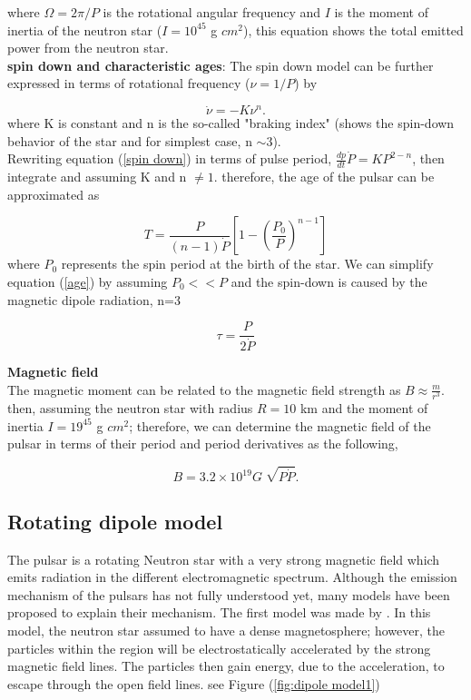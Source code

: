 where $\Omega = 2\pi/P$ is the rotational angular frequency and $I$ is the moment of inertia of the neutron star ($I = 10^{45}$ g $cm^2$), this equation shows the total emitted power from the neutron star.\\

\textbf{spin down and characteristic ages}: The spin down model can be further expressed in terms of rotational frequency ($\nu = 1/P$) by

\begin{equation}
\label{spin down}
\dot \nu = -K \nu^n.
\end{equation}
where K is constant and n is the so-called "braking index" (shows the spin-down behavior of the star and for simplest case, n $\sim 3$).\\
Rewriting equation (\ref{spin down}) in terms of pulse period, $\frac{dp}{dt} \dot{P} = K P^{2-n}$, then integrate and assuming K and n $\neq 1$. therefore, the age of the pulsar can be approximated as

\begin{equation}
\label{age}
T=\frac{P}{(n-1) \dot{P}} \left[1- \left(\frac{P_0}{P} \right)^{n-1}  \right]
\end{equation}
where $P_0 $ represents the spin period at the birth of the star. We can simplify equation (\ref{age}) by assuming $P_{0} << P$ and the spin-down is caused by the  magnetic dipole radiation, n=3 

\begin{equation}
\tau = \frac{P}{2\dot{P}}
\end{equation}

\textbf{Magnetic field}\\
The magnetic moment can be related to the magnetic field strength as $B \approx \frac{m}{r^3}$. then, assuming the neutron star with radius $R=10$ km and the moment of inertia $I = 19^{45} $ g $cm^2$; therefore, we can determine the magnetic field of the pulsar in terms of their period and period derivatives as the following,

\begin{equation}
B = 3.2 \times 10^{19}G \sqrt[]{P \dot{P} }.
\end{equation}
 

\subsection{Rotating dipole model}
The pulsar is a rotating Neutron star with a very strong magnetic field which emits radiation in the different electromagnetic spectrum. Although the emission mechanism of the pulsars has not fully understood yet, many models have been proposed to explain their mechanism. The first model was made by \citet{goldreich1969pulsar}. In this model, the neutron star assumed to have a dense magnetosphere; however, the particles within the region will be electrostatically accelerated by the strong magnetic field lines. The particles then gain energy, due to the acceleration, to escape through the open field lines. see Figure (\ref{fig:dipole model1})

